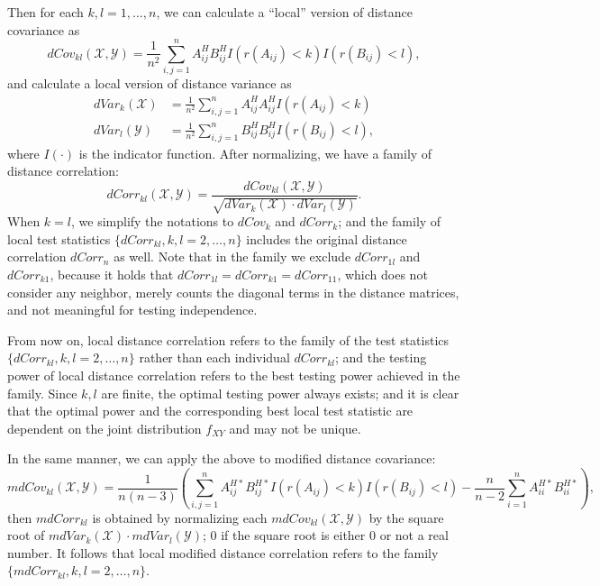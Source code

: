 \documentclass[11pt]{article}
\begin{document}
Then for each $k,l=1,\ldots,n$, we can calculate a ``local'' version of distance covariance as
\begin{equation}
\label{localdCovEqu}
dCov_{kl}(\mathcal{X},\mathcal{Y})=\frac{1}{n^2}\sum_{i,j=1}^{n}A^{H}_{ij}B^{H}_{ij}I(r(A_{ij})<k)I(r(B_{ij})<l),
\end{equation}
and calculate a local version of distance variance as
\begin{align*}
dVar_{k}(\mathcal{X}) &=\frac{1}{n^2}\sum_{i,j=1}^{n}A^{H}_{ij}A^{H}_{ij}I(r(A_{ij})<k)\\
dVar_{l}(\mathcal{Y}) &=\frac{1}{n^2}\sum_{i,j=1}^{n}B^{H}_{ij}B^{H}_{ij}I(r(B_{ij})<l),
\end{align*}
where $I(\cdot)$ is the indicator function. After normalizing, we have a family of distance correlation:
\begin{equation}
\label{localdCorrEqu}
dCorr_{kl}(\mathcal{X},\mathcal{Y})=\frac{dCov_{kl}(\mathcal{X},\mathcal{Y})}{\sqrt{dVar_{k}(\mathcal{X}) \cdot dVar_{l}(\mathcal{Y})}}.
\end{equation}
When $k=l$, we simplify the notations to $dCov_{k}$ and $dCorr_{k}$; and the family of local test statistics $\{dCorr_{kl}, k,l=2,\ldots,n\}$ includes the original distance correlation $dCorr_{n}$ as well. Note that in the family we exclude $dCorr_{1l}$ and $dCorr_{k1}$, because it holds that $dCorr_{1l}=dCorr_{k1}=dCorr_{11}$, which does not consider any neighbor, merely counts the diagonal terms in the distance matrices, and not meaningful for testing independence.

From now on, local distance correlation refers to the family of the test statistics $\{dCorr_{kl}, k,l=2,\ldots,n\}$ rather than each individual $dCorr_{kl}$; and the testing power of local distance correlation refers to the best testing power achieved in the family. Since $k,l$ are finite, the optimal testing power always exists; and it is clear that the optimal power and the corresponding best local test statistic are dependent on the joint distribution $f_{XY}$ and may not be unique.

In the same manner, we can apply the above to modified distance covariance:
\begin{equation}
\label{localmdCovEqu}
mdCov_{kl}(\mathcal{X},\mathcal{Y})=\frac{1}{n(n-3)}(\sum_{i,j=1}^{n}A^{H*}_{ij}B^{H*}_{ij}I(r(A_{ij})<k)I(r(B_{ij})<l)-\frac{n}{n-2}\sum_{i=1}^{n}A^{H*}_{ii}B^{H*}_{ii}),
\end{equation}
then $mdCorr_{kl}$ is obtained by normalizing each $mdCov_{kl}(\mathcal{X},\mathcal{Y})$ by the square root of $mdVar_{k}(\mathcal{X}) \cdot mdVar_{l}(\mathcal{Y})$; $0$ if the square root is either $0$ or not a real number. It follows that local modified distance correlation refers to the family $\{mdCorr_{kl}, k,l=2,\ldots,n\}$.
\end{document}
